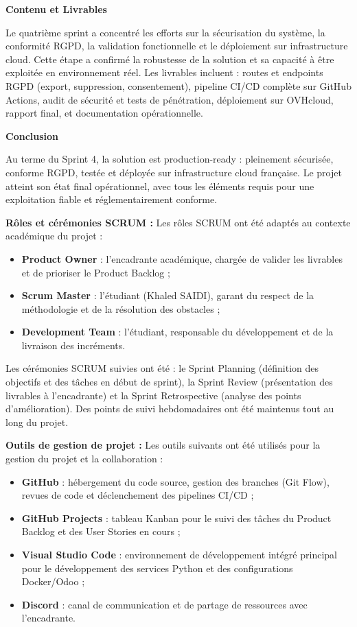 \textbf{Contenu et Livrables}

Le quatrième sprint a concentré les efforts sur la sécurisation du système, la conformité RGPD, la validation fonctionnelle et le déploiement sur infrastructure cloud. Cette étape a confirmé la robustesse de la solution et sa capacité à être exploitée en environnement réel. Les livrables incluent : routes et endpoints RGPD (export, suppression, consentement), pipeline CI/CD complète sur GitHub Actions, audit de sécurité et tests de pénétration, déploiement sur OVHcloud, rapport final, et documentation opérationnelle.

\textbf{Conclusion}

Au terme du Sprint 4, la solution est production-ready : pleinement sécurisée, conforme RGPD, testée et déployée sur infrastructure cloud française. Le projet atteint son état final opérationnel, avec tous les éléments requis pour une exploitation fiable et réglementairement conforme.

\textbf{Rôles et cérémonies SCRUM :} Les rôles SCRUM ont été adaptés au contexte académique du projet :
\begin{itemize}
    \item \textbf{Product Owner} : l'encadrante académique, chargée de valider les livrables et de prioriser le Product Backlog ;
    \item \textbf{Scrum Master} : l'étudiant (Khaled SAIDI), garant du respect de la méthodologie et de la résolution des obstacles ;
    \item \textbf{Development Team} : l'étudiant, responsable du développement et de la livraison des incréments.
\end{itemize}

Les cérémonies SCRUM suivies ont été : le Sprint Planning (définition des objectifs et des tâches en début de sprint), la Sprint Review (présentation des livrables à l'encadrante) et la Sprint Retrospective (analyse des points d'amélioration). Des points de suivi hebdomadaires ont été maintenus tout au long du projet.

\textbf{Outils de gestion de projet :} Les outils suivants ont été utilisés pour la gestion du projet et la collaboration :
\begin{itemize}
    \item \textbf{GitHub} : hébergement du code source, gestion des branches (Git Flow), revues de code et déclenchement des pipelines CI/CD ;
    \item \textbf{GitHub Projects} : tableau Kanban pour le suivi des tâches du Product Backlog et des User Stories en cours ;
    \item \textbf{Visual Studio Code} : environnement de développement intégré principal pour le développement des services Python et des configurations Docker/Odoo ;
    \item \textbf{Discord} : canal de communication et de partage de ressources avec l'encadrante.
\end{itemize}

